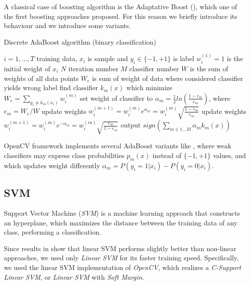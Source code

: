 A classical case of boosting algorithm is the Adaptative Boost ()\cite{Friedman98additivelogistic}, which one of the first boosting approaches proposed. For this reason we briefly introduce its behaviour and we introduce some variants.

\begin{algorithm}
\caption{Discrete AdaBoost algorithm (binary classification)} 
\label{alg:adaboost}
\begin{algorithmic}
\STATE $i=1,\ldots,T$ training data, $x_i$ is sample and $y_i \in \{-1,+1\}$ is label
\STATE $w_{i}^{(1)}=1$ is the initial weight of $x_i$
\STATE $N$ iteration number
\STATE $M$ classifier number
\STATE $W$ is the sum of weights of all data points
\STATE $W_e$ is sum of weight of data where considered classifier yields wrong label
		\STATE find classifier $k_{m}(x)$ which minimize $W_e=\sum_{y_i \neq k_m(x_i)}{w_{i}^{(m)}}$
		\STATE set weight of classifier to $\alpha_{m}=\frac{1}{2}ln(\frac{1-e_m}{e_m}) $, where $e_m=W_e/W$
	 		\STATE update weights $w_{i}^{(m+1)}=w_{i}^{(m)}e^{\alpha_m}=w_{i}^{(m)}\sqrt{\frac{1-e_m}{e_m}}$
		\ELSE
			\STATE update weights $w_{i}^{(m+1)}=w_{i}^{(m)}e^{-\alpha_m}=w_{i}^{(m)}\sqrt{\frac{e_m}{1-e_m}}$
 		\ENDIF
\STATE output $sign( \sum_{m \in 1 \ldots M}{ \alpha_m k_m (x)} )$
\ENDFOR
\end{algorithmic}
\end{algorithm}

OpenCV framework implements several AdaBoost variants like , where weak classifiers may express class probabilities $p_m(x)$ instead of $\{-1,+1\}$ values, and  which updates weight differently $\alpha_{m}=P(y_i=1|x_i)-P(y_i=0|x_i)$. 


\subsection{SVM}

Support Vector Machine (\emph{SVM}) is a machine learning approach that
constructs an hyperplane, which maximizes the distance between the training
data of any class, performing a classification.

Since results in \cite{Littlewort04dynamicsof} show that linear SVM performs
slightly better than non-linear approaches, we used only \emph{Linear SVM} for
its faster training speed. Specifically, we used the linear SVM implementation
of \emph{OpenCV}, which realizes a \emph{C-Support Linear SVM}, or \emph{Linear
SVM} with \emph{Soft Margin}.

